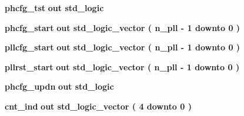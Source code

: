 \begin{DoxyCompactItemize}
\item 
{\bf phcfg\+\_\+tst}  {\bfseries {\bfseries \textcolor{keywordflow}{out}\textcolor{vhdlchar}{ }}} {\bfseries \textcolor{comment}{std\+\_\+logic}\textcolor{vhdlchar}{ }} 
\item 
{\bf phcfg\+\_\+start}  {\bfseries {\bfseries \textcolor{keywordflow}{out}\textcolor{vhdlchar}{ }}} {\bfseries \textcolor{comment}{std\+\_\+logic\+\_\+vector}\textcolor{vhdlchar}{ }\textcolor{vhdlchar}{(}\textcolor{vhdlchar}{ }\textcolor{vhdlchar}{ }\textcolor{vhdlchar}{ }\textcolor{vhdlchar}{ }{\bfseries {\bf n\+\_\+pll}} \textcolor{vhdlchar}{-\/}\textcolor{vhdlchar}{ } \textcolor{vhdldigit}{1} \textcolor{vhdlchar}{ }\textcolor{keywordflow}{downto}\textcolor{vhdlchar}{ }\textcolor{vhdlchar}{ } \textcolor{vhdldigit}{0} \textcolor{vhdlchar}{ }\textcolor{vhdlchar}{)}\textcolor{vhdlchar}{ }} 
\item 
{\bf pllcfg\+\_\+start}  {\bfseries {\bfseries \textcolor{keywordflow}{out}\textcolor{vhdlchar}{ }}} {\bfseries \textcolor{comment}{std\+\_\+logic\+\_\+vector}\textcolor{vhdlchar}{ }\textcolor{vhdlchar}{(}\textcolor{vhdlchar}{ }\textcolor{vhdlchar}{ }\textcolor{vhdlchar}{ }\textcolor{vhdlchar}{ }{\bfseries {\bf n\+\_\+pll}} \textcolor{vhdlchar}{-\/}\textcolor{vhdlchar}{ } \textcolor{vhdldigit}{1} \textcolor{vhdlchar}{ }\textcolor{keywordflow}{downto}\textcolor{vhdlchar}{ }\textcolor{vhdlchar}{ } \textcolor{vhdldigit}{0} \textcolor{vhdlchar}{ }\textcolor{vhdlchar}{)}\textcolor{vhdlchar}{ }} 
\item 
{\bf pllrst\+\_\+start}  {\bfseries {\bfseries \textcolor{keywordflow}{out}\textcolor{vhdlchar}{ }}} {\bfseries \textcolor{comment}{std\+\_\+logic\+\_\+vector}\textcolor{vhdlchar}{ }\textcolor{vhdlchar}{(}\textcolor{vhdlchar}{ }\textcolor{vhdlchar}{ }\textcolor{vhdlchar}{ }\textcolor{vhdlchar}{ }{\bfseries {\bf n\+\_\+pll}} \textcolor{vhdlchar}{-\/}\textcolor{vhdlchar}{ } \textcolor{vhdldigit}{1} \textcolor{vhdlchar}{ }\textcolor{keywordflow}{downto}\textcolor{vhdlchar}{ }\textcolor{vhdlchar}{ } \textcolor{vhdldigit}{0} \textcolor{vhdlchar}{ }\textcolor{vhdlchar}{)}\textcolor{vhdlchar}{ }} 
\item 
{\bf phcfg\+\_\+updn}  {\bfseries {\bfseries \textcolor{keywordflow}{out}\textcolor{vhdlchar}{ }}} {\bfseries \textcolor{comment}{std\+\_\+logic}\textcolor{vhdlchar}{ }} 
\item 
{\bf cnt\+\_\+ind}  {\bfseries {\bfseries \textcolor{keywordflow}{out}\textcolor{vhdlchar}{ }}} {\bfseries \textcolor{comment}{std\+\_\+logic\+\_\+vector}\textcolor{vhdlchar}{ }\textcolor{vhdlchar}{(}\textcolor{vhdlchar}{ }\textcolor{vhdlchar}{ } \textcolor{vhdldigit}{4} \textcolor{vhdlchar}{ }\textcolor{keywordflow}{downto}\textcolor{vhdlchar}{ }\textcolor{vhdlchar}{ } \textcolor{vhdldigit}{0} \textcolor{vhdlchar}{ }\textcolor{vhdlchar}{)}\textcolor{vhdlchar}{ }} 

\end{DoxyCompactItemize}
